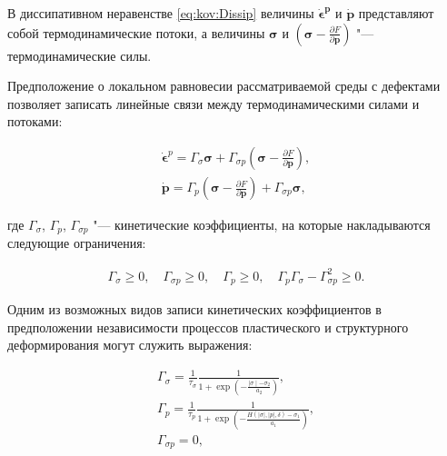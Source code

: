 В диссипативном неравенстве \eqref{eq:kov:Dissip} величины $\boldsymbol{\dot{\epsilon}^{p}}$  и $\dot{\boldsymbol{p}}$ представляют собой термодинамические потоки, а величины $\boldsymbol{\sigma}$ и $(\boldsymbol{\sigma}-\frac{\partial F}{\partial{\boldsymbol{p}}})$ "--- термодинамические силы.

Предположение о локальном равновесии рассматриваемой среды с дефектами позволяет записать линейные связи между термодинамическими силами и потоками:

\begin{gather}

\boldsymbol{\dot{\epsilon}}^{p}=\Gamma_{\sigma}\boldsymbol{\sigma}+\Gamma_{\sigma p}(\boldsymbol{\sigma}-\frac{\partial F}{\partial{\boldsymbol{p}}}), \label{eq:kov:Plstrain1}\\

\dot{\boldsymbol{p}}=\Gamma_{p}(\boldsymbol{\sigma}-\frac{\partial F}{\partial{\boldsymbol{p}}})+\Gamma_{\sigma p}\boldsymbol{\sigma}, \label{eq:kov:Strstrain1}

\end{gather}

где  $\Gamma_{\sigma}$, $\Gamma_{p}$, $\Gamma_{\sigma p}$ "--- кинетические коэффициенты, на которые накладываются следующие ограничения:

\begin{gather*}

\Gamma_{\sigma}\geq0,\quad

\Gamma_{\sigma p}\geq0,\quad

\Gamma_{p}\geq0,\quad

\Gamma_{p}\Gamma_{\sigma}-\Gamma^2_{\sigma p}\geq0.

\end{gather*}

Одним из возможных видов записи кинетических коэффициентов в предположении независимости процессов пластического и структурного деформирования могут служить выражения:

\begin{gather}

\Gamma_{\sigma}=\frac{1}{\tau_{\sigma}}\frac{1}{1+\exp{\left(-\frac{\mid\sigma\mid-\sigma_{2}}{a_{2}}\right)}}, \label{eq:kov:GammaS}\\

\Gamma_{p}=\frac{1}{\tau_{p}}\frac{1}{1+\exp{\left(-\frac{H(\mid\sigma\mid,\mid p \mid,\delta)-\sigma_{1}}{a_{1}}\right)}}, \label{eq:kov:GammaPS}\\

\Gamma_{\sigma p}=0, \label{eq:kov:GammaPS}

\end{gather}

